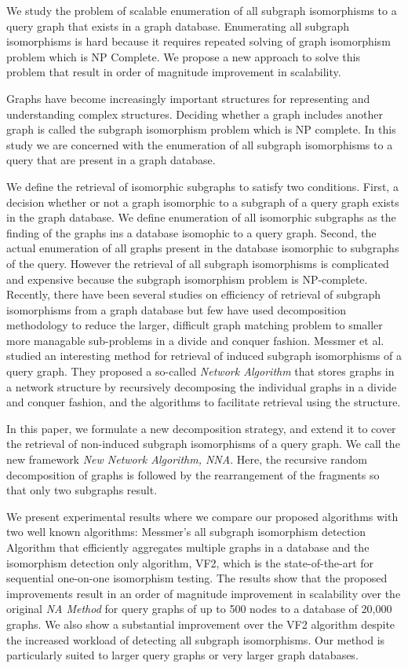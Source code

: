 We study the problem of scalable enumeration of all subgraph isomorphisms to a query graph that exists in a graph database. Enumerating all subgraph isomorphisms is hard because it requires repeated solving of graph isomorphism problem which is NP Complete. We  propose a new  approach to solve this problem that result in order of magnitude improvement in scalability. 

Graphs have become increasingly important structures for representing and understanding complex structures. Deciding whether a graph includes another graph is called the subgraph isomorphism problem which is NP complete. In this study we are concerned with the enumeration of all subgraph isomorphisms to a query that are present in a graph database.

We define the retrieval of isomorphic subgraphs to satisfy two conditions.  
First, a decision whether or not a graph isomorphic to a subgraph of a query graph exists in the graph database.
We define enumeration of all isomorphic subgraphs as the finding of the graphs ins a database isomophic to a query graph.
 Second, the actual enumeration of all graphs present in the database isomorphic to subgraphs of the query. However the retrieval of all subgraph isomorphisms is complicated and expensive because the subgraph isomorphism problem is NP-complete.
Recently, there have been several studies on efficiency of retrieval of subgraph isomorphisms from a graph database but few have used decomposition methodology to reduce the larger, difficult graph matching problem to smaller more managable sub-problems in a divide and conquer fashion. Messmer et al. studied an interesting method for retrieval of induced subgraph isomorphisms of a query graph. They proposed a so-called \textit{Network Algorithm} that stores graphs  in a network structure  by recursively decomposing the individual graphs in a divide and conquer fashion, and the algorithms to facilitate retrieval using the structure.

In this paper, we formulate a new decomposition strategy, and extend it to cover the retrieval of non-induced subgraph isomorphisms of a query graph. We call the new framework  \textit{New  Network Algorithm, NNA}. Here, the recursive random decomposition of graphs is followed by the rearrangement of the fragments so that only two subgraphs result.

We present experimental results where we compare our proposed algorithms with two well known algorithms: Messmer's all subgraph isomorphism detection Algorithm that efficiently aggregates multiple graphs in a database and the isomorphism detection only algorithm, VF2, which is the state-of-the-art for sequential one-on-one isomorphism testing. The results show that the proposed improvements result in an order of magnitude improvement in scalability over the original \textit{NA Method}  for query graphs of up to 500 nodes to a database of 20,000 graphs. We also show a substantial improvement over the VF2 algorithm despite the increased workload of detecting all subgraph isomorphisms. Our method is particularly suited to larger query graphs or very larger graph databases.

